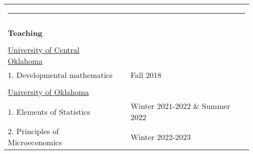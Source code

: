\documentclass[10pt,letterpaper]{article}
\begin{document}
\begin{tabular}{p{3.25in}p{1.5in}p{6.25in}}
\multicolumn{3}{p{7.5in}}{\hrule}\\
\\
{\textbf{\large{Teaching }}} &\\
\\
\underline{University of Central Oklahoma}                       &                    & \vspace{0.25 cm}\\
1.  Developmental mathematics                  &              & Fall 2018 \\
\\
\underline{University of Oklahoma }                        &                   & \vspace{0.25 cm}\\
1. Elements of Statistics             &               & Winter 2021-2022 \& Summer 2022\\
2.  Principles of Microeconomics             &               & Winter 2022-2023\\

\end{tabular}








\end{document}
